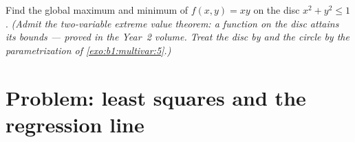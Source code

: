 \begin{exercise}[$\star\star\star$]\label{exo:b1:multivar:12}
Find the global maximum and minimum of $f(x, y) = xy$ on the
 disc $x^2 + y^2 \leq 1$. \emph{(Admit the two-variable
extreme value theorem: a  function on the  disc
attains its bounds --- proved in the Year~2 volume. Treat the
 disc by  and the  circle by the
parametrization of \cref{exo:b1:multivar:5}.)}
\end{exercise}

\section{Problem: least squares and the regression line}

